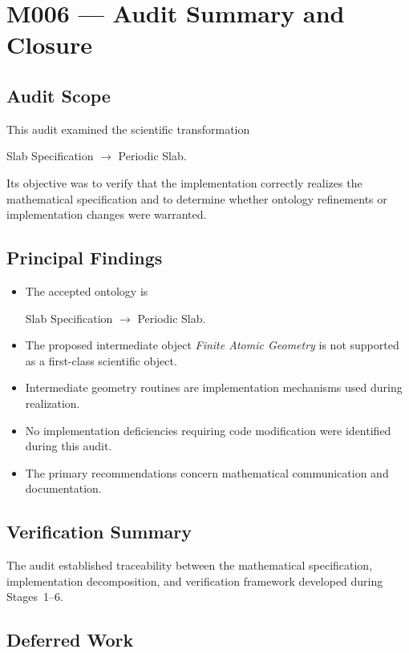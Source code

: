 \chapter{M006 --- Audit Summary and Closure}

\section{Audit Scope}

This audit examined the scientific transformation

\begin{center}
Slab Specification $\rightarrow$ Periodic Slab.
\end{center}

Its objective was to verify that the implementation correctly realizes the
mathematical specification and to determine whether ontology refinements or
implementation changes were warranted.

\section{Principal Findings}

\begin{itemize}
\item The accepted ontology is
\begin{center}
Slab Specification $\rightarrow$ Periodic Slab.
\end{center}
\item The proposed intermediate object \emph{Finite Atomic Geometry} is not
supported as a first-class scientific object.
\item Intermediate geometry routines are implementation mechanisms used during
realization.
\item No implementation deficiencies requiring code modification were
identified during this audit.
\item The primary recommendations concern mathematical communication and
documentation.
\end{itemize}

\section{Verification Summary}

The audit established traceability between the mathematical specification,
implementation decomposition, and verification framework developed during
Stages~1--6.

\section{Deferred Work}

